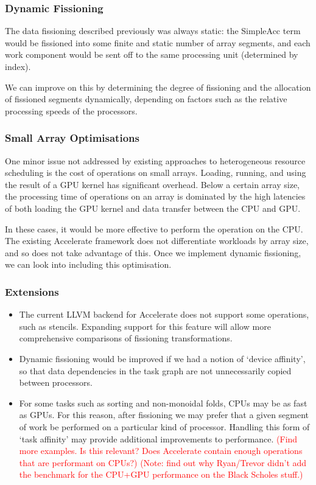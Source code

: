 \documentclass[a4paper,12pt]{article}
\newcommand{\red}[1]{\textcolor{red}{#1}}
\begin{document}
\subsubsection*{Dynamic Fissioning}
The data fissioning described previously was always static: the SimpleAcc term would be fissioned into some finite and static number of array segments, and each work component would be sent off to the same processing unit (determined by index).

We can improve on this by determining the degree of fissioning and the allocation of fissioned segments dynamically, depending on factors such as the relative processing speeds of the processors.

\subsubsection*{Small Array Optimisations}
One minor issue not addressed by existing approaches to heterogeneous resource scheduling is the cost of operations on small arrays.
Loading, running, and using the result of a GPU kernel has significant overhead.
Below a certain array size, the processing time of operations on an array is dominated by the high latencies of both loading the GPU kernel and data transfer between the CPU and GPU.

In these cases, it would be more effective to perform the operation on the CPU.
The existing Accelerate framework does not differentiate workloads by array size, and so does not take advantage of this.
Once we implement dynamic fissioning, we can look into including this optimisation.

\subsubsection*{Extensions}
\begin{itemize}
  \item 
    The current LLVM backend for Accelerate does not support some operations, such as stencils.
    Expanding support for this feature will allow more comprehensive comparisons of fissioning transformations.
  \item
    Dynamic fissioning would be improved if we had a notion of `device affinity', so that data dependencies in the task graph are not unnecessarily copied between processors.
  \item
    For some tasks such as sorting and non-monoidal folds, CPUs may be as fast as GPUs.
    For this reason, after fissioning we may prefer that a given segment of work be performed on a particular kind of processor.
    Handling this form of `task affinity' may provide additional improvements to performance.
    \red{(Find more examples. Is this relevant? Does Accelerate contain enough operations that are performant on CPUs?)}
    \red{(Note: find out why Ryan/Trevor didn't add the benchmark for the CPU+GPU performance on the Black Scholes stuff.)}
\end{itemize}
\end{document}
